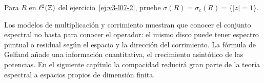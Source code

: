 \begin{ejercicio}\label{ej:v3-ampl-shift}
Para $R$ en $\ell^2(\mathbb Z)$ del ejercicio~\ref{ej:v3-l07-2}, pruebe $\sigma(R)=\sigma_c(R)=\{|z|=1\}$.
\end{ejercicio}


Los modelos de multiplicación y corrimiento muestran que conocer el conjunto espectral no basta para conocer el operador: el mismo disco puede tener espectro puntual o residual según el espacio y la dirección del corrimiento. La fórmula de Gelfand añade una información cuantitativa, el crecimiento asintótico de las potencias. En el siguiente capítulo la compacidad reducirá gran parte de la teoría espectral a espacios propios de dimensión finita.
